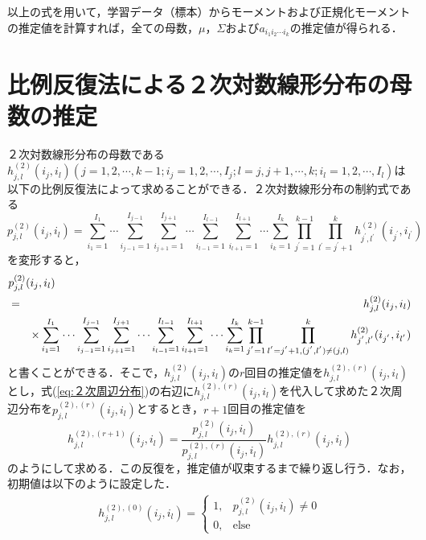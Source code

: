 以上の式を用いて，学習データ（標本）からモーメントおよび正規化モーメントの推定値を計算すれば，全ての母数，$\mu$，$\Sigma$および$a_{i_{1}i_{2}\cdots i_{k}}$の推定値が得られる．

\section{比例反復法による２次対数線形分布の母数の推定} \label{app:比例反復法}

２次対数線形分布の母数である$h^{(2)}_{j,l}(i_{j},i_{l}) (j=1,2, \cdots ,k-1;　i_{j}=1,2, \cdots ,I_{j};　l=j,j+1, \cdots ,k;　i_{l}=1,2, \cdots ,I_{l})$は以下の比例反復法によって求めることができる．２次対数線形分布の制約式である
\begin{equation}
p^{(2)}_{j,l}(i_{j},i_{l})=
  \sum_{i_{1}=1}^{I_{1}} \cdots \sum_{i_{j-1}=1}^{I_{j-1}}
  \sum_{i_{j+1}=1}^{I_{j+1}} \cdots \sum_{i_{l-1}=1}^{I_{l-1}}
  \sum_{i_{l+1}=1}^{I_{l+1}} \cdots \sum_{i_{k}=1}^{I_{k}}
  \prod_{j^{'}=1}^{k-1} \prod_{l^{'}=j^{'}+1}^{k}
  h^{(2)}_{j^{'},l^{'}}(i_{j^{'}},i_{l^{'}})
 \label{eq:２次周辺分布}
\end{equation}
を変形すると，
\begin{eqnarray}
 \lefteqn{
    p^{(2)}_{j,l}(i_{j},i_{l})
 }  \nonumber \\
  &=& h^{(2)}_{j,l}(i_{j},i_{l}) \nonumber \\
  & & \times 
  \sum_{i_{1}=1}^{I_{1}} \cdots \sum_{i_{j-1}=1}^{I_{j-1}}
  \sum_{i_{j+1}=1}^{I_{j+1}} \cdots \sum_{i_{l-1}=1}^{I_{l-1}}
  \sum_{i_{l+1}=1}^{I_{l+1}} \cdots \sum_{i_{k}=1}^{I_{k}}
  \prod_{j^{'}=1}^{k-1} 
  \prod_{l^{'}=j^{'}+1,(j^{'},l^{'})\neq (j,l)}^{k} 
   h^{(2)}_{j^{'},l^{'}}(i_{j^{'}},i_{l^{'}}) \nonumber \\
\end{eqnarray}
と書くことができる．そこで，$h^{(2)}_{j,l}(i_{j},i_{l})$の$r$回目の推定値を$h^{(2),(r)}_{j,l}(i_{j},i_{l})$とし，式(\ref{eq:２次周辺分布})の右辺に$h^{(2),(r)}_{j,l}(i_{j},i_{l})$を代入して求めた２次周辺分布を$p^{(2),(r)}_{j,l}(i_{j},i_{l})$とするとき，$r+1$回目の推定値を
\begin{equation}
    h^{(2),(r+1)}_{j,l}(i_{j},i_{l})
  = \frac{p^{(2)}_{j,l}(i_{j},i_{l})}
  {p^{(2),(r)}_{j,l}(i_{j},i_{l})}
  h^{(2),(r)}_{j,l}(i_{j},i_{l})
\end{equation}
のようにして求める．この反復を，推定値が収束するまで繰り返し行う．なお，初期値は以下のように設定した．
\begin{eqnarray}
 h^{(2),(0)}_{j,l}(i_{j},i_{l})=
  \left\{
  \begin{array}{ll}
   1, & \mbox{$p^{(2)}_{j,l}(i_{j},i_{l})\neq 0$} \\
   0, & \mbox{else}
  \end{array}
  \right.
\end{eqnarray}




